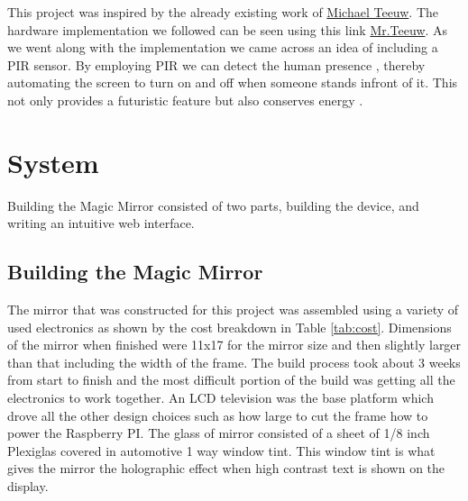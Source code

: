 \documentclass[conference]{IEEEtran}
\begin{document}
This project was inspired by the already existing work of \href{http://michaelteeuw.nl/}{Michael Teeuw}. The hardware implementation we followed can be seen using this link \href{http://michaelteeuw.nl/post/80391333672/magic-mirror-part-i-the-idea-the-mirror}{Mr.Teeuw}. As we went along with the implementation we came across an idea of including a PIR sensor. By employing PIR we can detect the human presence , thereby automating the screen to turn on and off when someone stands infront of it. This not only provides a futuristic feature but also conserves energy . 


\section{System} 
Building the Magic Mirror consisted of two parts, building the device, and writing an intuitive web interface.
\subsection{Building the Magic Mirror}
The mirror that was constructed for this project was assembled using a variety of used electronics as shown by the cost breakdown in Table \ref{tab:cost}.
Dimensions of the mirror when finished were 11x17 for the mirror size and then slightly larger than that including the width of the frame.
The build process took about 3 weeks from start to finish and the most difficult portion of the build was getting all the electronics to work together.
An LCD television was the base platform which drove all the other design choices such as how large to cut the frame how to power the Raspberry PI.
The glass of mirror consisted of a sheet of 1/8 inch Plexiglas covered in automotive 1 way window tint.
This window tint is what gives the mirror the holographic effect when high contrast text is shown on the display.
\end{document}
